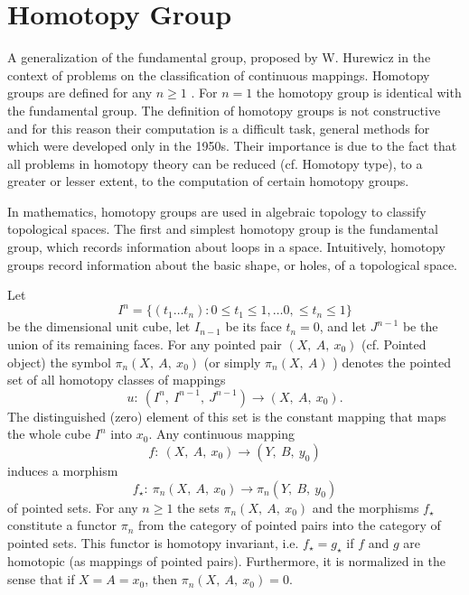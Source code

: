 \chapter{Homotopy Group}


A generalization of the fundamental group, proposed by W. Hurewicz 
\cite{Steenrod1951} in the context of problems on the classification of 
continuous mappings. Homotopy groups are defined for any $  n \geq 1 $ . 
For $  n = 1 $ 
the homotopy group is identical with the fundamental group. The definition 
of homotopy groups is not constructive and for this reason their computation 
is a difficult task, general methods for which were developed only in the 
1950s. Their importance is due to the fact that all problems in homotopy 
theory can be reduced (cf. Homotopy type), to a greater or lesser extent, 
to the computation of certain homotopy groups.

In mathematics, homotopy groups are used in algebraic topology to classify 
topological spaces. The first and simplest homotopy group is the fundamental 
group, which records information about loops in a space. Intuitively, 
homotopy groups record information about the basic shape, or holes, of a 
topological space.

Let
$$ 
I ^{n}  =  \{ {( t_{1} \dots t_{n} )} : 
{0 \leq t_{1} \leq 1, \dots 0, \leq t_{n} \leq 1} \}
$$ 
be the dimensional unit cube, let $ I_{n-1} $ be its face $ t_{n} = 0 $, 
and let $ J^{n-1} $ be the union of its remaining faces. For any pointed 
pair $ ( X ,\  A ,\  x_{0} ) $ (cf. Pointed object) the symbol 
$\pi_{n} ( X ,\  A ,\  x_{0} )$ (or simply $\pi_{n} ( X ,\  A )$ ) denotes 
the pointed set of all homotopy classes of mappings
$$ 
u : \  ( I^{n} ,\  I^{n-1} ,\  J^{n-1} ) \rightarrow ( X ,\  A ,\  x_{0} ) .
$$ 
The distinguished (zero) element of this set is the constant mapping that 
maps the whole cube $I^{n}$ into $x_{0}$. Any continuous mapping
$$ 
f: \  (X,\  A,\  x_{0}) \rightarrow (Y,\  B,\  y_{0})
$$ 
induces a morphism
$$ 
f_\star:\  \pi_{n} (X,\  A,\  x_{0}) \rightarrow \pi_{n} (Y,\  B,\  y_{0})
$$ 
of pointed sets. For any $n \geq 1$ the sets $\pi_{n} (X,\  A,\  x_{0}) $ 
and the morphisms $f_\star$ constitute a functor $\pi_{n}$ 
from the category of pointed pairs into the category of pointed sets. 
This functor is homotopy invariant, i.e. $f_\star = g_\star$ if $f$ 
and $g$ are homotopic (as mappings of pointed pairs). Furthermore, it is 
normalized in the sense that if $X = A = x_{0}$, then 
$\pi_{n} (X ,\  A ,\  x_{0}) = 0$.


